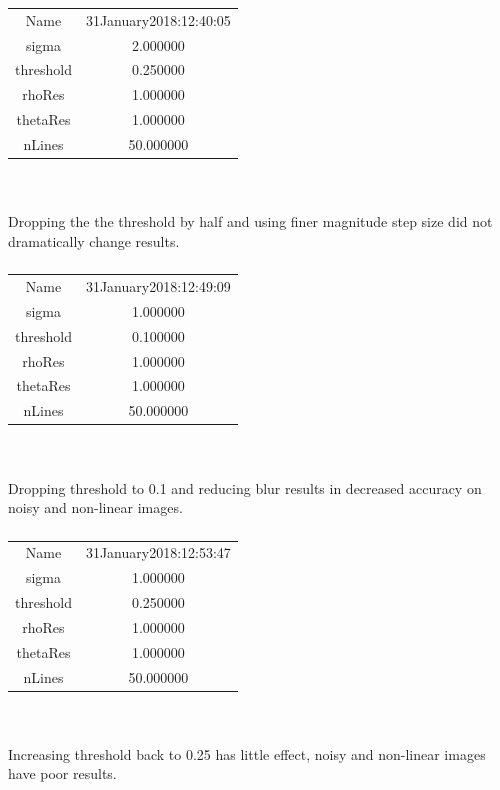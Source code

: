 \documentclass[12pt]{article}
\begin{document}
\subsubsection{}
\begin{tabular} { c c }
Name & 31January2018:12:40:05\\
sigma & 2.000000\\
threshold & 0.250000\\
rhoRes & 1.000000\\
thetaRes & 1.000000\\
nLines & 50.000000
\end{tabular}
\\ \\
Dropping the the threshold by half and using finer magnitude step size did not dramatically change results.

\subsubsection{}
\begin{tabular} { c c }
Name & 31January2018:12:49:09\\
sigma & 1.000000\\
threshold & 0.100000\\
rhoRes & 1.000000\\
thetaRes & 1.000000\\
nLines & 50.000000
\end{tabular}
\\ \\
Dropping threshold to 0.1 and reducing blur results in decreased accuracy on noisy and non-linear images.

\subsubsection{}
\begin{tabular} { c c }
Name & 31January2018:12:53:47\\
sigma & 1.000000\\
threshold & 0.250000\\
rhoRes & 1.000000\\
thetaRes & 1.000000\\
nLines & 50.000000
\end{tabular}
\\ \\
Increasing threshold back to 0.25 has little effect, noisy and non-linear images have poor results.
\end{document}
